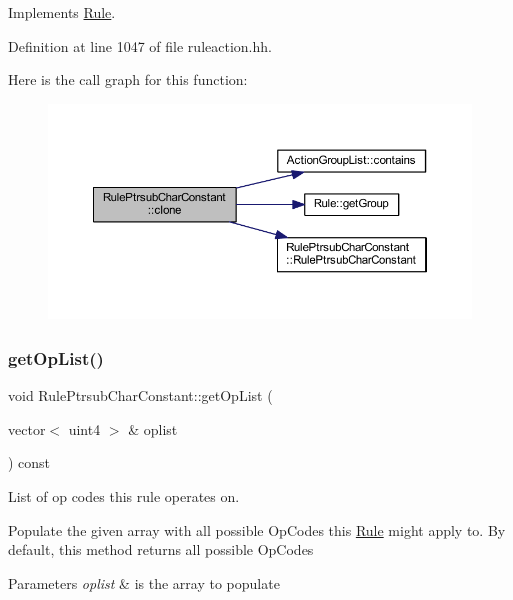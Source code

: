 Implements \mbox{\hyperlink{class_rule_a70de90a76461bfa7ea0b575ce3c11e4d}{Rule}}.



Definition at line 1047 of file ruleaction.\+hh.

Here is the call graph for this function\+:
\nopagebreak
\begin{figure}[H]
\begin{center}
\leavevmode
\includegraphics[width=350pt]{class_rule_ptrsub_char_constant_a3e7b0e275531779c7df244f561d71dff_cgraph}
\end{center}
\end{figure}
\mbox{\label{class_rule_ptrsub_char_constant_a2d41a1c92b18f97b63c483d6e2cab2fb}} 
\subsubsection{\texorpdfstring{getOpList()}{getOpList()}}
{\footnotesize\ttfamily void Rule\+Ptrsub\+Char\+Constant\+::get\+Op\+List (\begin{DoxyParamCaption}\item[{vector$<$ uint4 $>$ \&}]{oplist }\end{DoxyParamCaption}) const\hspace{0.3cm}{\ttfamily [virtual]}}



List of op codes this rule operates on. 

Populate the given array with all possible Op\+Codes this \mbox{\hyperlink{class_rule}{Rule}} might apply to. By default, this method returns all possible Op\+Codes 
\begin{DoxyParams}{Parameters}
{\em oplist} & is the array to populate \\
\hline
\end{DoxyParams}


